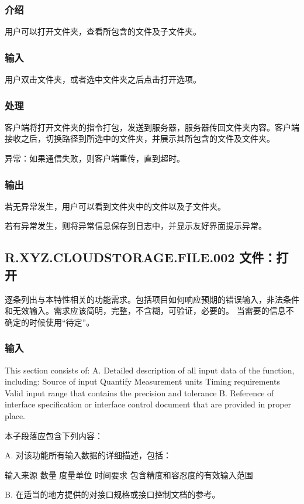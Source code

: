 \subsubsection{介绍}
用户可以打开文件夹，查看所包含的文件及子文件夹。

\subsubsection{输入}
用户双击文件夹，或者选中文件夹之后点击打开选项。

\subsubsection{处理}
客户端将打开文件夹的指令打包，发送到服务器，服务器传回文件夹内容。客户端接收之后，切换路径到所选中的文件夹，并展示其所包含的文件及文件夹。

异常：如果通信失败，则客户端重传，直到超时。

\subsubsection{输出}
若无异常发生，用户可以看到文件夹中的文件以及子文件夹。

若有异常发生，则将异常信息保存到日志中，并显示友好界面提示异常。
\subsection{R.XYZ.CLOUDSTORAGE.FILE.002 文件：打开}


逐条列出与本特性相关的功能需求。包括项目如何响应预期的错误输入，非法条件和无效输入。需求应该简明，完整，不含糊，可验证，必要的。 当需要的信息不确定的时候使用“待定”。
\subsubsection{输入}
This section consists of:
A. Detailed description of all input data of the function, including:
Source of input
Quantify
Measurement units
Timing requirements
Valid input range that contains the precision and tolerance
B. Reference of interface specification or interface control document that are provided in proper place.

本子段落应包含下列内容：

A. 对该功能所有输入数据的详细描述，包括：

		输入来源
		数量
		度量单位
		时间要求
		包含精度和容忍度的有效输入范围
		
B. 在适当的地方提供的对接口规格或接口控制文档的参考。
